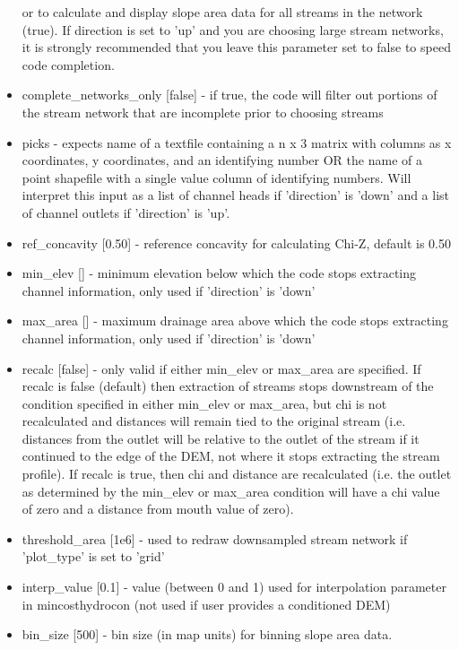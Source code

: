 \begin{itemize}
or to calculate and display slope area data for all streams in the network (true). If direction is set to 'up' and you are choosing large stream
networks, it is strongly recommended that you leave this parameter set to false to speed code completion. 
\item complete\_networks\_only [false] - if true, the code will filter out portions of the stream network that are incomplete prior to choosing
streams
\item picks - expects name of a textfile containing a n x 3 matrix with columns as x coordinates, y coordinates, and an identifying number OR the name of a point shapefile 
with a single value column of identifying numbers. Will interpret this input as a list of channel heads if 'direction' is 'down' and a list of channel outlets 
if 'direction' is 'up'.
\item ref\_concavity [0.50] - reference concavity for calculating Chi-Z, default is 0.50
\item min\_elev [] - minimum elevation below which the code stops extracting channel information, only used if 'direction'
is 'down'
\item max\_area [] - maximum drainage area above which the code stops extracting channel information, only used if 'direction'
is 'down'
\item recalc [false] - only valid if either min\_elev or max\_area are specified. If recalc is false (default) then extraction of 
streams stops downstream of the condition specified in either min\_elev or max\_area, but chi is not recalculated 
and distances will remain tied to the original stream (i.e. distances from the outlet will be relative to the outlet
of the stream if it continued to the edge of the DEM, not where it stops extracting the stream profile). If recalc is true, 
then chi and distance are recalculated (i.e. the outlet as determined by the min\_elev or max\_area condition
will have a chi value of zero and a distance from mouth value of zero).
\item threshold\_area [1e6] - used to redraw downsampled stream network if 'plot\_type' is set to 'grid'
\item interp\_value [0.1] - value (between 0 and 1) used for interpolation parameter in mincosthydrocon (not used if user provides a conditioned DEM)
\item bin\_size [500] - bin size (in map units) for binning slope area data.
\end{itemize}

